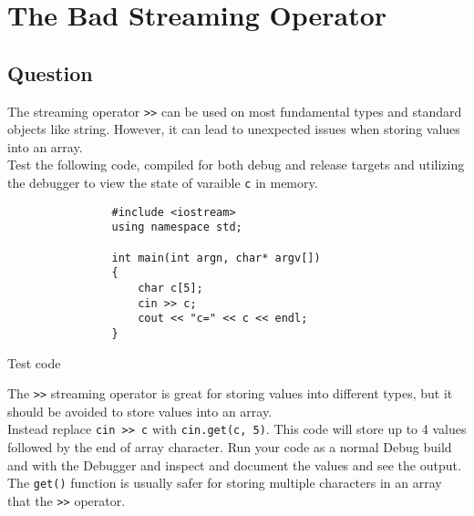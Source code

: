 \section{The Bad Streaming Operator}
    \subsection*{Question}
        The streaming operator \texttt{>>} can be used on most fundamental types and standard objects like string. However, 
        it can lead to unexpected issues when storing values into an array.\\

        Test the following code, compiled for both debug and release targets and 
        utilizing the debugger to view the state of varaible \texttt{c} in memory. \\
    
        \begin{listing}[H]
            \begin{verbatim}
                #include <iostream>
                using namespace std;

                int main(int argn, char* argv[])
                {
                    char c[5];
                    cin >> c;
                    cout << "c=" << c << endl;
                }
            \end{verbatim}
            \caption{Test code}
        \end{listing}

        The \texttt{>>} streaming operator is great for storing values into different types, 
        but it should be avoided to store values into an array.\\

        Instead replace \texttt{cin >> c} with \texttt{cin.get(c, 5)}.
        This code will store up to 4 values followed by the end of array character. 
        Run your code as a normal Debug build and with the Debugger and inspect and document the values and see the output. 
        The \texttt{get()} function is usually safer for storing multiple characters in an array that the \texttt{>>} operator.
        
